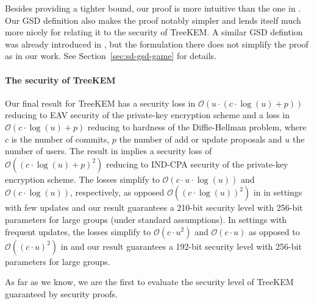 Besides providing a tighter bound, our proof is more intuitive than the one in \cite{ttkem}. Our GSD definition also makes the proof notably simpler and lends itself much more nicely for relating it to the security of TreeKEM. A similar GSD defintion was already introduced in \cite{modular-group-messaging}, but the formulation there does not simplify the proof as in our work. See Section~\ref{sec:sd-gsd-game} for details.

\paragraph{The security of TreeKEM} Our final result for TreeKEM has a security loss in $\mathcal{O}(u \cdot (c \cdot \log(u) + p))$ reducing to EAV security of the private-key encryption scheme and a loss in $\mathcal{O}(c \cdot \log(u) + p)$ reducing to hardness of the Diffie-Hellman problem, where $c$ is the number of commits, $p$ the number of add or update proposals and $u$ the number of users. The result in \cite{ttkem} implies a security loss of $\mathcal{O}((c \cdot \log(u) + p)^2)$ reducing to IND-CPA security of the private-key encryption scheme.
The losses simplify to $\mathcal{O}(c \cdot u \cdot \log(u))$ and $\mathcal{O}(c \cdot \log(u))$, respectively, as opposed $\mathcal{O}((c \cdot \log(u))^2)$ in \cite{ttkem} in settings with few updates and our result guarantees a 210-bit security level with 256-bit parameters for large groups (under standard assumptions).
In settings with frequent updates, the losses simplify to $\mathcal{O}(c \cdot u^2)$ and $\mathcal{O}(c \cdot u)$ as opposed to $\mathcal{O}((c \cdot u)^2)$ in \cite{ttkem} and our result guarantees a 192-bit security level with 256-bit parameters for large groups.

As far as we know, we are the first to evaluate the security level of TreeKEM guaranteed by security proofs.
